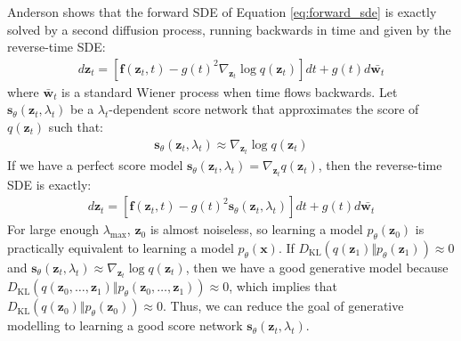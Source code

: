 \documentclass[ oneside,%
                    author={George Herbert},
                    degree={MSci},
                     title={Diffusion Models for Time-Evolving Precipitation Fields},
                  subtitle={}]{dissertation}
\begin{document}
Anderson \cite{Reverse_Time_Diffusion_Anderson} shows that the forward SDE of Equation \ref{eq:forward_sde} is exactly solved by a second diffusion process, running backwards in time and given by the reverse-time SDE:
\begin{align}
      d\mathbf{z}_t=\left[\mathbf{f}(\mathbf{z}_t, t)-g(t)^2\nabla_{\mathbf{z}_t}\log q(\mathbf{z}_t)\right]dt + g(t)d\bar{\mathbf{w}_t}
\end{align}
where $\bar{\mathbf{w}}_t$ is a standard Wiener process when time flows backwards. Let $\mathbf{s}_\theta(\mathbf{z}_t, \lambda_t)$ be a $\lambda_t$-dependent score network \cite{Generative_Modelling_By_Estimating_Gradients_Song} that approximates the score of $q(\mathbf{z}_t)$ such that:
\begin{align}
      \mathbf{s}_\theta(\mathbf{z}_t, \lambda_t)\approx \nabla_{\mathbf{z}_t} \log q(\mathbf{z}_t)\label{eq:score_network}
\end{align}
If we have a perfect score model $\mathbf{s}_\theta(\mathbf{z}_t, \lambda_t)=\nabla_{\mathbf{z}_t}q(\mathbf{z}_t)$, then the reverse-time SDE is exactly:
\begin{align}
      d\mathbf{z}_t=\left[\mathbf{f}(\mathbf{z}_t, t)-g(t)^2\mathbf{s}_\theta(\mathbf{z}_t, \lambda_t)\right]dt + g(t)d\bar{\mathbf{w}_t}
\end{align}
For large enough $\lambda_{\max}$, $\mathbf{z}_0$ is almost noiseless, so learning a model $p_\theta(\mathbf{z}_0)$ is practically equivalent to learning a model $p_\theta(\mathbf{x})$. If $D_{\mathrm{KL}}(q(\mathbf{z}_1)\Vert p_\theta(\mathbf{z}_1))\approx 0$ and $\mathbf{s}_\theta(\mathbf{z}_t,\lambda_t)\approx \nabla_{\mathbf{z}_t}\log q(\mathbf{z}_t)$, then we have a good generative model because $D_{\mathrm{KL}}(q(\mathbf{z}_0,\ldots,\mathbf{z}_1)\Vert p_\theta(\mathbf{z}_0,\ldots,\mathbf{z}_1))\approx 0$, which implies that $D_{\mathrm{KL}}(q(\mathbf{z}_0)\Vert p_\theta(\mathbf{z}_0))\approx 0$. Thus, we can reduce the goal of generative modelling to learning a good score network $\mathbf{s}_\theta(\mathbf{z}_t,\lambda_t)$.
\end{document}
